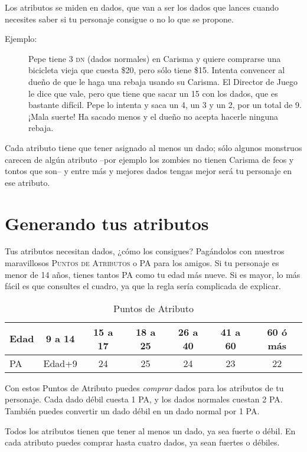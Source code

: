 Los atributos se miden en dados, que van a ser los dados que lances cuando necesites saber si tu personaje consigue o no lo que se propone. 

\begin{description}
\item[Ejemplo:] Pepe tiene 3 \textsc{dn} (dados normales) en Carisma y quiere comprarse una bicicleta vieja que cuesta \$20, pero sólo tiene \$15. Intenta convencer al dueño de que le haga una rebaja usando su Carisma. El Director de Juego le dice que vale, pero que tiene que sacar un 15 con los dados, que es bastante difícil. Pepe lo intenta y saca un 4, un 3 y un 2, por un total de 9. ¡Mala suerte! Ha sacado menos y el dueño no acepta hacerle ninguna rebaja.
\end{description}

Cada atributo tiene que tener asignado al menos un dado; sólo algunos monstruos carecen de algún atributo --por ejemplo los zombies no tienen Carisma de feos y tontos que son-- y entre más y mejores dados tengas mejor será tu personaje en ese atributo.

\section{Generando tus atributos}

Tus atributos necesitan dados, ¿cómo los consigues? Pagándolos con nuestros maravillosos \textsc{Puntos de Atributos} o \textsc{PA} para los amigos. Si tu personaje es menor de 14 años, tienes tantos \textsc{PA} como tu edad más nueve. Si es mayor, lo más fácil es que consultes el cuadro, ya que la regla sería complicada de explicar. 

\begin{table}[h]
\centering
\begin{tabular}{l c c c c c c}
\toprule
Edad&9 a 14&15 a 17&18 a 25&26 a 40&41 a 60&60 ó más\\\midrule
\textsc{PA}&Edad+9&24&25&24&23&22\\\midrule
\bottomrule
\end{tabular}
\caption{Puntos de Atributo}
\end{table}

Con estos Puntos de Atributo puedes \emph{comprar} dados para los atributos de tu personaje. Cada dado débil cuesta 1 \textsc{PA}, y los dados normales cuestan 2 \textsc{PA}. También puedes convertir un dado débil en un dado normal por 1 \textsc{PA}.

Todos los atributos tienen que tener al menos un dado, ya sea fuerte o débil. En cada atributo puedes comprar hasta cuatro dados, ya sean fuertes o débiles.

